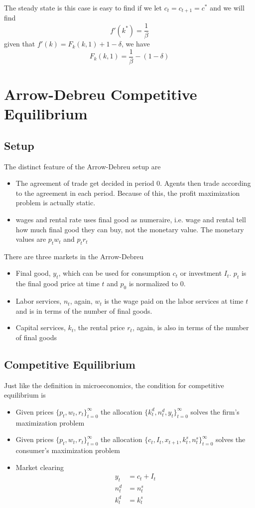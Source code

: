 \documentclass[twocolumn, fleqn]{article}
\begin{document}
	The steady state is this case is easy to find if we let $c_t = c_{t+1} =c^\ast$ and we will find 
	\[f'(k^\ast) = \frac{1}{\beta}\]
	given that $f'(k)=F_k (k,1)+1-\delta$, we have
	\[F_k (k,1)=\frac{1}{\beta} -(1-\delta)\]
	
	\section{Arrow-Debreu Competitive Equilibrium}
	
	\subsection{Setup}
	The distinct feature of the Arrow-Debreu setup are 
	\begin{itemize}
		\item The agreement of trade get decided in period 0. Agents then trade according to the agreement in each period. Because of this, the profit maximization problem is actually static.
		\item wages and rental rate uses final good as numeraire, i.e. wage and rental tell how much final good they can buy, not the monetary value. The monetary values are $p_t w_t$ and $p_t r_t$
	\end{itemize}
	
	There are three markets in the Arrow-Debreu
	\begin{itemize}
		\item Final good, $y_t$, which can be used for consumption $c_t$ or investment $I_t$. $p_t$ is the final good price at time $t$ and $p_0$ is normalized to 0.
		\item Labor services, $n_t$, again, $w_t$ is the wage paid on the labor services at time $t$ and is in terms of the number of final goods.
		\item Capital services, $k_t$, the rental price $r_t$, again, is also in terms of the number of final goods
	\end{itemize}
	
	\subsection{Competitive Equilibrium}
	Just like the definition in microeconomics, the condition for competitive equilibrium is 
	\begin{itemize}
		\item Given prices $\{ p_t, w_t , r_t \}_{t=0}^{\infty}$ the allocation $\{k_t^d, n_t^d, y_t\}_{t=0}^\infty$ solves the firm's maximization problem
		\item Given prices $\{ p_t, w_t , r_t \}_{t=0}^{\infty}$ the allocation $\{c_t, I_t, x_{t+1}, k_t^s, n_t^s\}_{t=0}^\infty$ solves the consumer's maximization problem
		\item Market clearing \begin{align*}
			y_t &=c_t + I_t\\
			n_t^d &= n_t^s\\
			k_t^d &= k_t^s
		\end{align*}
	\end{itemize}
	
\end{document}
